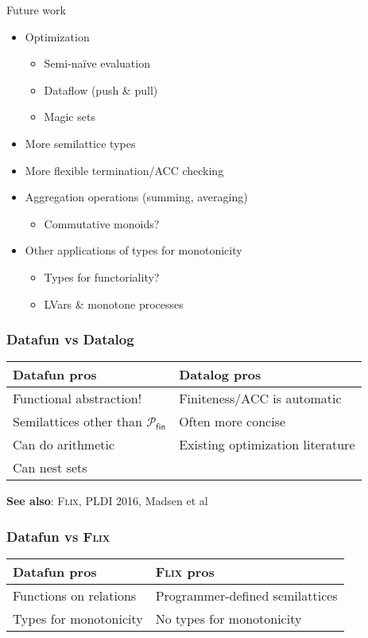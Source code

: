 \documentclass{beamer}
\newcommand{\ms}{\mathsf}
\begin{document}
\begin{frame}{Future work}\large
  \begin{itemize}
  \item Optimization
    \begin{itemize}\normalsize
    \item Semi-na\"ive evaluation
    \item Dataflow (push \& pull)
    \item Magic sets
    \end{itemize}
  \item More semilattice types
  \item More flexible termination/ACC checking
  \item Aggregation operations (summing, averaging)
    \begin{itemize}\normalsize
    \item Commutative monoids?
    \end{itemize}
  \item Other applications of types for monotonicity
    \begin{itemize}\normalsize
    \item Types for functoriality?
    \item LVars \& monotone processes
    \end{itemize}
  \end{itemize}
\end{frame}

\begin{frame}
  \frametitle{Datafun vs Datalog}

  \begin{center}
    \begin{tabular}{l|l}
      \textbf{Datafun pros} & \textbf{Datalog pros}\\\hline
      Functional abstraction! & Finiteness/ACC is automatic\\
      Semilattices other than $\mathcal{P}_{\ms{fin}}$ & Often more concise\\
      Can do arithmetic & Existing optimization literature\\
      Can nest sets
    \end{tabular}
  \end{center}

  \vspace{2em}

  \textbf{See also}: \textsc{Flix}, PLDI 2016, Madsen et al
\end{frame}

\begin{frame}
  \frametitle{Datafun vs \textsc{Flix}}

  \begin{center}
    \begin{tabular}{l|l}
      \textbf{Datafun pros} & \textsc{Flix}\textbf{ pros}\\\hline
      Functions on relations & Programmer-defined semilattices\\
      Types for monotonicity & No types for monotonicity
    \end{tabular}
  \end{center}
\end{frame}
\end{document}
